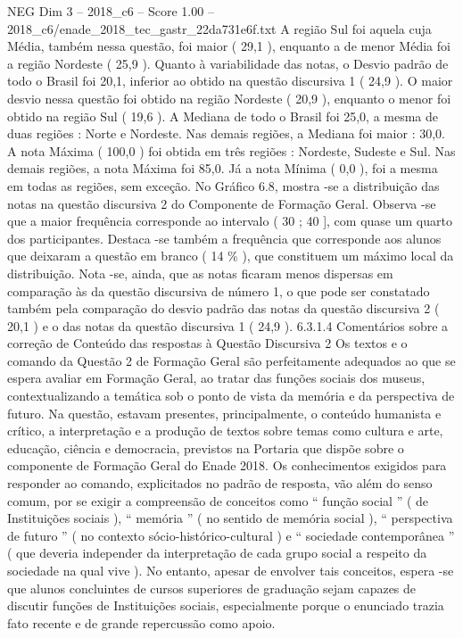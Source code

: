 \begin{textsample}{NEG Dim 3 – 2018\_c6 – Score 1.00 – 2018\_c6/enade\_2018\_tec\_gastr\_22da731e6f.txt}
A região Sul foi aquela cuja Média, também nessa questão, foi maior ( 29,1 ), enquanto a de menor Média foi a região Nordeste ( 25,9 ).
Quanto à variabilidade das notas, o Desvio padrão de todo o Brasil foi 20,1, inferior ao obtido na questão discursiva 1 ( 24,9 ).
O maior desvio nessa questão foi obtido na região Nordeste ( 20,9 ), enquanto o menor foi obtido na região Sul ( 19,6 ).
A Mediana de todo o Brasil foi 25,0, a mesma de duas regiões : Norte e Nordeste.
Nas demais regiões, a Mediana foi maior : 30,0.
A nota Máxima ( 100,0 ) foi obtida em três regiões : Nordeste, Sudeste e Sul.
Nas demais regiões, a nota Máxima foi 85,0.
Já a nota Mínima ( 0,0 ), foi a mesma em todas as regiões, sem exceção.
No Gráfico 6.8, mostra -se a distribuição das notas na questão discursiva 2 do Componente de Formação Geral.
Observa -se que a maior frequência corresponde ao intervalo ( 30 ; 40 ], com quase um quarto dos participantes.
Destaca -se também a frequência que corresponde aos alunos que deixaram a questão em branco ( 14 \% ), que constituem um máximo local da distribuição.
Nota -se, ainda, que as notas ficaram menos dispersas em comparação às da questão discursiva de número 1, o que pode ser constatado também pela comparação do desvio padrão das notas da questão discursiva 2 ( 20,1 ) e o das notas da questão discursiva 1 ( 24,9 ). 6.3.1.4 Comentários sobre a correção de Conteúdo das respostas à Questão Discursiva 2 Os textos e o comando da Questão 2 de Formação Geral são perfeitamente adequados ao que se espera avaliar em Formação Geral, ao tratar das funções sociais dos museus, contextualizando a temática sob o ponto de vista da memória e da perspectiva de futuro.
Na questão, estavam presentes, principalmente, o conteúdo humanista e crítico, a interpretação e a produção de textos sobre temas como cultura e arte, educação, ciência e democracia, previstos na Portaria que dispõe sobre o componente de Formação Geral do Enade 2018.
Os conhecimentos exigidos para responder ao comando, explicitados no padrão de resposta, vão além do senso comum, por se exigir a compreensão de conceitos como “ função social ” ( de Instituições sociais ), “ memória ” ( no sentido de memória social ), “ perspectiva de futuro ” ( no contexto sócio-histórico-cultural ) e “ sociedade contemporânea ” ( que deveria independer da interpretação de cada grupo social a respeito da sociedade na qual vive ).
No entanto, apesar de envolver tais conceitos, espera -se que alunos concluintes de cursos superiores de graduação sejam capazes de discutir funções de Instituições sociais, especialmente porque o enunciado trazia fato recente e de grande repercussão como apoio.

\end{textsample}
